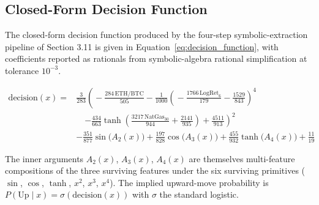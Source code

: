\documentclass[11pt,a4paper,oneside]{article}
\begin{document}
\begin{table}[H]
\centering
\scriptsize
\setlength{\tabcolsep}{4pt}
\renewcommand{\arraystretch}{0.9}
\caption{Leave-one-out PBO. Baseline (six-model) PBO is 0.657. Each column drops one model and recomputes PBO on the remaining $5 \times 7$ Sharpe matrix. \hyperref[ref:loo_pbo_call]{$\hookleftarrow$}}
\label{tab:loo_pbo}
\end{table}

\newpage
\subsection{Closed-Form Decision Function}\label{app:symbolic}

The closed-form decision function produced by the four-step symbolic-extraction pipeline of Section 3.11 is given in Equation~\ref{eq:decision_function}, with coefficients reported as rationals from symbolic-algebra rational simplification at tolerance $10^{-3}$.

{\footnotesize
\begin{equation}
\label{eq:decision_function}
\begin{split}
\text{decision}(x) ={}
& \tfrac{3}{283}\!\left(\!-\tfrac{284\,\text{ETH/BTC}}{505} - \tfrac{1}{1000}\!\left(\!-\tfrac{1766\,\text{LogRet}_6}{179} - \tfrac{1529}{843}\!\right)^{\!4} \right. \\
& \quad \left. - \tfrac{434}{663}\tanh\!\left(\tfrac{3217\,\text{NatGas}_{30}}{944} + \tfrac{2141}{935}\right) + \tfrac{4511}{913}\right)^{\!2} \\
& - \tfrac{351}{877}\sin\!\bigl(A_2(x)\bigr) + \tfrac{197}{828}\cos\!\bigl(A_3(x)\bigr) + \tfrac{455}{932}\tanh\!\bigl(A_4(x)\bigr) + \tfrac{11}{19}
\end{split}
\end{equation}
}

The inner arguments $A_2(x)$, $A_3(x)$, $A_4(x)$ are themselves multi-feature compositions of the three surviving features under the six surviving primitives ($\sin$, $\cos$, $\tanh$, $x^2$, $x^3$, $x^4$). The implied upward-move probability is $P(\text{Up} \mid x) = \sigma(\text{decision}(x))$ with $\sigma$ the standard logistic.
\end{document}
